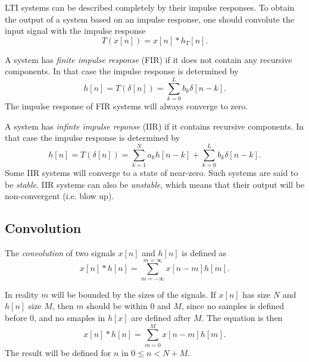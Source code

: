 \documentclass{article}
\def\lsqb{\left[}
\def\rsqb{\right]}
\def\sqb#1{\lsqb #1 \rsqb}
\def\xsig{x\sqb{n}}
\begin{document}
LTI systems can be described completely by their impulse responses. To obtain the output of a system based on an impulse response, one should convolute the input signal with the impulse response
\begin{equation}
    T(\xsig) = \xsig * h_T\sqb{n}.
\end{equation}

A system has \textit{finite impulse response} (FIR) if it does not contain any recursive components. In that case the impulse response is determined by
\begin{equation}
    h\sqb{n} = T(\delta\sqb{n}) = \sum_{k = 0}^L b_k \delta\sqb{n - k}.
\end{equation}
The impulse response of FIR systems will always converge to zero.

A system has \textit{infinte impulse reponse} (IIR) if it contains recursive components. In that case the impulse response is determined by
\begin{equation}
    h\sqb{n} = T(\delta\sqb{n}) = \sum_{k=1}^N a_k h\sqb{n - k} + \sum_{k = 0}^L b_k \delta\sqb{n - k}.
\end{equation}
Some IIR systems will converge to a state of near-zero. Such systems are said to be \textit{stable}. IIR systems can also be \textit{unstable}, which means that their output will be non-convergent (i.e. blow up).

\subsection{Convolution}
The \textit{convolution} of two signals $\xsig$ and $h\sqb{n}$ is defined as
\begin{equation}
    \xsig * h\sqb{n} = \sum_{m = -\infty}^{m = \infty} x\sqb{n - m}h\sqb{m}.
\end{equation}

In reality $m$ will be bounded by the sizes of the signals. If $\xsig$ has size $N$ and $h\sqb{n}$ size $M$, then $m$ should be within $0$ and $M$, since no samples is defined before $0$, and no smaples in $h\sqb{x}$ are defined after $M$. The equation is then
\begin{equation}
    \xsig * h\sqb{n} = \sum_{m = 0}^{M} x\sqb{n - m}h\sqb{m}.
\end{equation}
The result will be defined for $n$ in $0 \leq n < N + M$.
\end{document}

